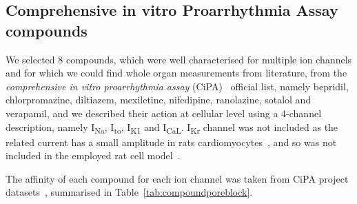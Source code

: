 \subsection{Comprehensive in vitro Proarrhythmia Assay compounds}\label{sec:ch6cipa_compounds}
We selected $8$ compounds, which were well characterised for multiple ion channels and for which we could find whole organ measurements from literature, from the \textit{comprehensive in vitro proarrhythmia assay} (\acs{CiPA})~\cite{Park:2019} official list, namely bepridil, chlorpromazine, diltiazem, mexiletine, nifedipine, ranolazine, sotalol and verapamil, and we described their action at cellular level using a 4-channel description, namely I\textsubscript{Na}, I\textsubscript{to}, I\textsubscript{K1} and I\textsubscript{CaL}. I\textsubscript{Kr} channel was not included as the related current has a small amplitude in rats cardiomyocytes~\cite{Wymore:1997}, and so was not included in the employed rat cell model~\cite{Gattoni:2017}.

\vspace{0.2cm}
The affinity of each compound for each ion channel was taken from CiPA project datasets~\cite{Li:2018, Li:2019}, summarised in Table~\ref{tab:compoundporeblock}.

